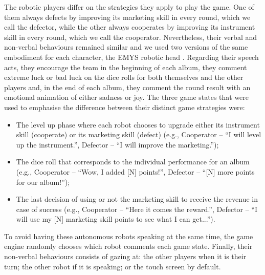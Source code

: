 The robotic players differ on the strategies they apply to play the game. One of them always defects by improving its marketing skill in every round, which we call the defector, while the other always cooperates by improving its instrument skill in every round, which we call the cooperator. Nevertheless, their verbal and non-verbal behaviours remained similar and we used two versions of the same embodiment for each character, the EMYS robotic head \cite{kkedzierski2013emys}. Regarding their speech acts, they encourage the team in the beginning of each album, they comment extreme luck or bad luck on the dice rolls for both themselves and the other players and, in the end of each album, they comment the round result with an emotional animation of either sadness or joy. The three game states that were used to emphasise the difference between their distinct game strategies were:
\begin{itemize}
    \item The level up phase where each robot chooses to upgrade either its instrument skill (cooperate) or its marketing skill (defect) (e.g., Cooperator -- ``I will level up the instrument.'', Defector -- ``I will improve the marketing.'');
    \item The dice roll that corresponds to the individual performance for an album (e.g., Cooperator -- ``Wow, I added [N] points!'', Defector -- ``[N] more points for our album!'');
    \item The last decision of using or not the marketing skill to receive the revenue in case of success (e.g., Cooperator -- ``Here it comes the reward.'', Defector -- ``I will use my [N] marketing skill points to see what I can get...'').
\end{itemize}
To avoid having these autonomous robots speaking at the same time, the game engine randomly chooses which robot comments each game state. Finally, their non-verbal behaviours consists of gazing at: the other players when it is their turn; the other robot if it is speaking; or the touch screen by default.



